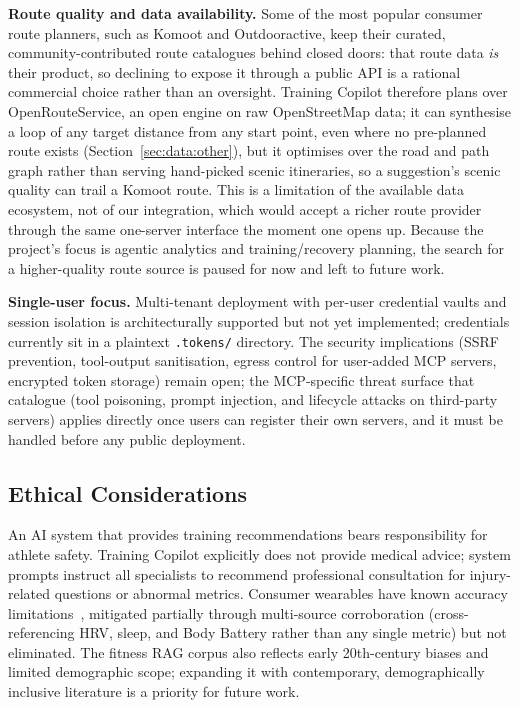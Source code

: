 \textbf{Route quality and data availability.} Some of the most popular consumer route planners, such as Komoot and Outdooractive, keep their curated, community-contributed route catalogues behind closed doors: that route data \textit{is} their product, so declining to expose it through a public API is a rational commercial choice rather than an oversight. Training Copilot therefore plans over OpenRouteService, an open engine on raw OpenStreetMap data; it can synthesise a loop of any target distance from any start point, even where no pre-planned route exists (Section~\ref{sec:data:other}), but it optimises over the road and path graph rather than serving hand-picked scenic itineraries, so a suggestion's scenic quality can trail a Komoot route. This is a limitation of the available data ecosystem, not of our integration, which would accept a richer route provider through the same one-server interface the moment one opens up. Because the project's focus is agentic analytics and training/recovery planning, the search for a higher-quality route source is paused for now and left to future work.

\textbf{Single-user focus.} Multi-tenant deployment with per-user credential vaults and session isolation is architecturally supported but not yet implemented; credentials currently sit in a plaintext \texttt{.tokens/} directory. The security implications (SSRF prevention, tool-output sanitisation, egress control for user-added MCP servers, encrypted token storage) remain open; the MCP-specific threat surface that \cite{hou_mcp_2025} catalogue (tool poisoning, prompt injection, and lifecycle attacks on third-party servers) applies directly once users can register their own servers, and it must be handled before any public deployment.

\subsection{Ethical Considerations}\label{sec:discussion:ethics}

An AI system that provides training recommendations bears responsibility for athlete safety. Training Copilot explicitly does not provide medical advice; system prompts instruct all specialists to recommend professional consultation for injury-related questions or abnormal metrics. Consumer wearables have known accuracy limitations~\citep{fuller_reliability_2020}, mitigated partially through multi-source corroboration (cross-referencing HRV, sleep, and Body Battery rather than any single metric) but not eliminated. The fitness RAG corpus also reflects early 20th-century biases and limited demographic scope; expanding it with contemporary, demographically inclusive literature is a priority for future work.

